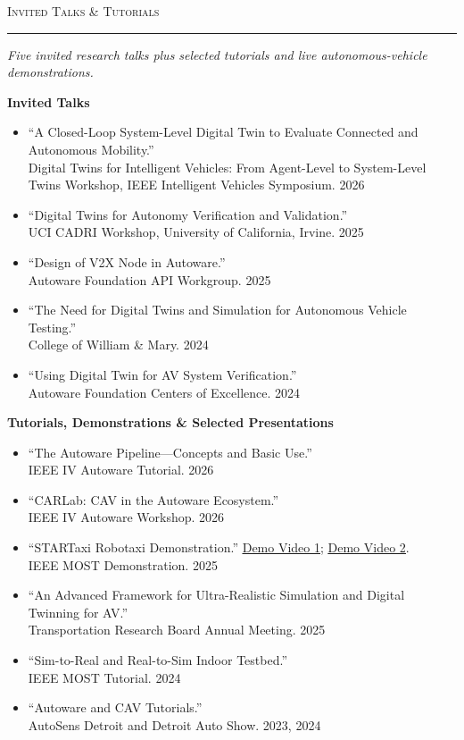 \documentclass[11pt]{article}
\let\cvplainhref\href
\renewcommand{\href}[2]{\cvplainhref{#1}{\uline{#2}}}
\newcommand{\cvsection}[1]{%
  \Needspace{5\baselineskip}%
  \vspace{0.62em}%
  {\large\scshape #1}\par
  \vspace{0.12em}\hrule\vspace{0.32em}
}
\newcommand{\cvsubsection}[1]{%
  \Needspace{3\baselineskip}%
  \vspace{0.32em}%
  {\bfseries #1}\par
  \vspace{0.12em}
}
\newcommand{\cvsummary}[1]{%
  {\itshape #1}\par
  \vspace{0.18em}
}
\begin{document}
\cvsection{Invited Talks \& Tutorials}
\cvsummary{Five invited research talks plus selected tutorials and live autonomous-vehicle demonstrations.}
\cvsubsection{Invited Talks}
\begin{itemize}
    \item ``A Closed-Loop System-Level Digital Twin to Evaluate Connected and Autonomous Mobility.''\\
    Digital Twins for Intelligent Vehicles: From Agent-Level to System-Level Twins Workshop, IEEE Intelligent Vehicles Symposium. \hfill 2026
    \item ``Digital Twins for Autonomy Verification and Validation.''\\
    UCI CADRI Workshop, University of California, Irvine. \hfill 2025
    \item ``Design of V2X Node in Autoware.''\\
    Autoware Foundation API Workgroup. \hfill 2025
    \item ``The Need for Digital Twins and Simulation for Autonomous Vehicle Testing.''\\
    College of William \& Mary. \hfill 2024
    \item ``Using Digital Twin for AV System Verification.''\\
    Autoware Foundation Centers of Excellence. \hfill 2024
\end{itemize}

\cvsubsection{Tutorials, Demonstrations \& Selected Presentations}
\begin{itemize}
    \item ``The Autoware Pipeline---Concepts and Basic Use.''\\
    IEEE IV Autoware Tutorial. \hfill 2026
    \item ``CARLab: CAV in the Autoware Ecosystem.''\\
    IEEE IV Autoware Workshop. \hfill 2026
    \item ``STARTaxi Robotaxi Demonstration.'' \href{https://www.youtube.com/watch?v=yeX6p5nSqgg}{Demo Video 1}; \href{https://www.youtube.com/watch?v=v4coj6eYNyY}{Demo Video 2}.\\
    IEEE MOST Demonstration. \hfill 2025
    \item ``An Advanced Framework for Ultra-Realistic Simulation and Digital Twinning for AV.''\\
    Transportation Research Board Annual Meeting. \hfill 2025
    \item ``Sim-to-Real and Real-to-Sim Indoor Testbed.''\\
    IEEE MOST Tutorial. \hfill 2024
    \item ``Autoware and CAV Tutorials.''\\
    AutoSens Detroit and Detroit Auto Show. \hfill 2023, 2024
\end{itemize}
\end{document}
